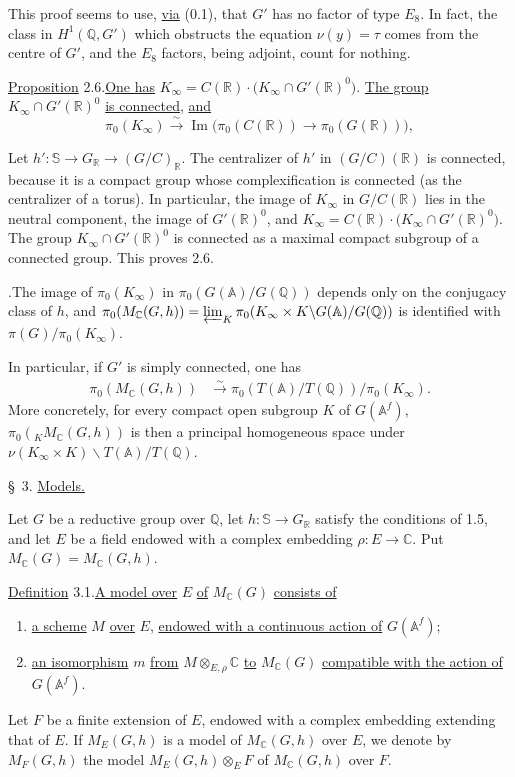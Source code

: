 \documentclass[10pt]{article}
\newcommand{\A}{\mathbb A}
\newcommand{\Af}{\mathbb A^f}
\newcommand{\C}{\mathbb C}
\newcommand{\Q}{\mathbb Q}
\newcommand{\R}{\mathbb R}
\newcommand{\bS}{\mathbb S}
\newcommand{\limproj}{\varprojlim}
\newcommand{\MC}{M_{\C}}
\begin{document}
This proof seems to use, \uline{via} (0.1), that $G'$ has no factor of type $E_8$. In fact, the class in $H^1(\Q,G')$ which obstructs the equation $\nu(y)=\tau$ comes from the centre of $G'$, and the $E_8$ factors, being adjoint, count for nothing.

\noindent\uline{Proposition} 2.6.\quad \uline{One has} $K_\infty=C(\R)\cdot\bigl(K_\infty\cap G'(\R)^0\bigr)$. \uline{The group} $K_\infty\cap G'(\R)^0$ \uline{is connected}, \uline{and}
\[
\pi_0(K_\infty)\xrightarrow{\sim}\operatorname{Im}\bigl(\pi_0(C(\R))\longrightarrow\pi_0(G(\R))\bigr),
\]

Let $h':\bS\to G_\R\to(G/C)_\R$. The centralizer of $h'$ in $(G/C)(\R)$ is connected, because it is a compact group whose complexification is connected (as the centralizer of a torus). In particular, the image of $K_\infty$ in $G/C(\R)$ lies in the neutral component, the image of $G'(\R)^0$, and $K_\infty=C(\R)\cdot\bigl(K_\infty\cap G'(\R)^0\bigr)$. The group $K_\infty\cap G'(\R)^0$ is connected as a maximal compact subgroup of a connected group. This proves 2.6.

.\quad The image of $\pi_0(K_\infty)$ in $\pi_0(G(\A)/G(\Q))$ depends only on the conjugacy class of $h$, and $\pi_0(\MC(G,h))=\limproj_K\pi_0(K_\infty\times K\backslash G(\A)/G(\Q))$ is identified with $\pi(G)/\pi_0(K_\infty)$.

In particular, if $G'$ is simply connected, one has
\begingroup
\makeatletter
\tagsleft@true
\makeatother
\begin{align}
\pi_0(\MC(G,h))&\xrightarrow{\sim}\pi_0(T(\A)/T(\Q))/\pi_0(K_\infty). \tag{2.7.1}
\end{align}
\endgroup
More concretely, for every compact open subgroup $K$ of $G(\Af)$, $\pi_0({}_K\MC(G,h))$ is then a principal homogeneous space under $\nu(K_\infty\times K)\backslash T(\A)/T(\Q)$.

\noindent \S\ 3. \uline{Models.}\par\vspace{0.9em}

Let $G$ be a reductive group over $\Q$, let $h:\bS\to G_\R$ satisfy the conditions of 1.5, and let $E$ be a field endowed with a complex embedding $\rho:E\to\C$. Put $\MC(G)=\MC(G,h)$.

\noindent\uline{Definition} 3.1.\quad \uline{A model over} $E$ \uline{of} $\MC(G)$ \uline{consists of}
\begin{enumerate}[label=(\alph*),leftmargin=2.4em]
\item \uline{a scheme} $M$ \uline{over} $E$, \uline{endowed with a continuous action of} $G(\Af)$;
\item \uline{an isomorphism} $m$ \uline{from} $M\otimes_{E,\rho}\C$ \uline{to} $\MC(G)$ \uline{compatible with the action of} $G(\Af)$.
\end{enumerate}
Let $F$ be a finite extension of $E$, endowed with a complex embedding extending that of $E$. If $M_E(G,h)$ is a model of $\MC(G,h)$ over $E$, we denote by $M_F(G,h)$ the model $M_E(G,h)\otimes_E F$ of $\MC(G,h)$ over $F$.
\end{document}
